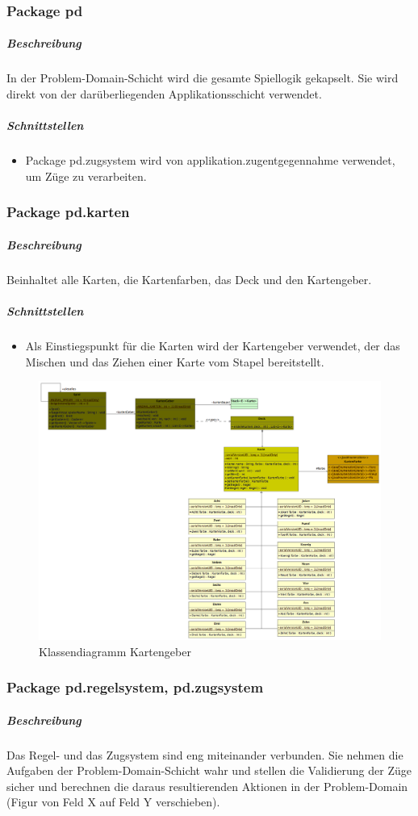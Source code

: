 \documentclass[12pt,halfparskip]{scrartcl}
\begin{document}
\clearpage

\subsubsection{Package pd}
\label{ssub:package_pd}
\subparagraph{Beschreibung}
In der Problem-Domain-Schicht wird die gesamte Spiellogik gekapselt. Sie wird direkt von der darüberliegenden Applikationsschicht verwendet.

\subparagraph{Schnittstellen}
\begin{itemize}
	\item Package pd.zugsystem wird von applikation.zugentgegennahme verwendet, um Züge zu verarbeiten.
\end{itemize}

\subsubsection{Package pd.karten}
\label{ssub:package_pd_karten}
\subparagraph{Beschreibung}
Beinhaltet alle Karten, die Kartenfarben, das Deck und den Kartengeber. 

\subparagraph{Schnittstellen}
\begin{itemize}
	\item Als Einstiegspunkt für die Karten wird der Kartengeber verwendet, der das Mischen und das Ziehen einer Karte vom Stapel bereitstellt.
\end{itemize}

\begin{figure}[h]
	\centering
	\includegraphics[width=0.8 \textwidth]{pd_kartengeber}
	\caption{Klassendiagramm Kartengeber}
	\label{fig:pd_kartengeber}
\end{figure}

\clearpage
\subsubsection{Package pd.regelsystem, pd.zugsystem}
\label{ssub:package_pd_regelsystem}
\subparagraph{Beschreibung}
Das Regel- und das Zugsystem sind eng miteinander verbunden. Sie nehmen die Aufgaben der Problem-Domain-Schicht wahr und stellen die Validierung der Züge sicher und berechnen die daraus resultierenden Aktionen in der Problem-Domain (Figur von Feld X auf Feld Y verschieben).
\end{document}
